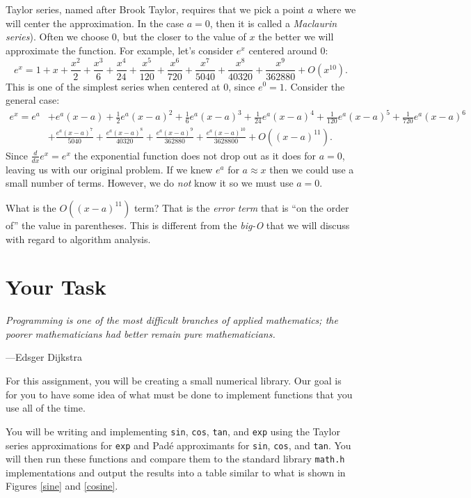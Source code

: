 \documentclass[11pt]{article}
\begin{document}
Taylor series, named after Brook Taylor, requires that we pick a point $a$ where we will center the approximation. In the case $a =0$, then it is called a \emph{Maclaurin series}).  Often we
choose $0$, but the closer to the value of $x$ the better we will
approximate the function. For example, let's consider $e^x$ centered
around $0$:
$$
e^x = 1  +x+\frac{x^2}{2}+\frac{x^3}{6}+\frac{x^4}{24}+\frac{x^5}{120}+\frac{x^6}{720}+\frac{x^7}
   {5040}+\frac{x^8}{40320}+\frac{x^9}{362880}+O\left(x^{10}\right
   ) .
$$
This is one of the simplest series when centered at $0$, since $e^0 = 1$.
Consider the general case:
\begin{align*}
e^x=e^a &+e^a (x-a)+\frac{1}{2} e^a (x-a)^2+\frac{1}{6} e^a (x-a)^3+\frac{1}{24} e^a
   (x-a)^4+\frac{1}{120} e^a (x-a)^5+\frac{1}{720} e^a (x-a)^6 \\
& +\frac{e^a
   (x-a)^7}{5040}+\frac{e^a (x-a)^8}{40320}+\frac{e^a (x-a)^9}{362880}+\frac{e^a
   (x-a)^{10}}{3628800}+O\left((x-a)^{11}\right) .
\end{align*}
Since $\frac{d}{dx}e^x=e^x$ the exponential function does not drop
out as it does for $a=0$, leaving us with our original problem. If we
knew $e^a$ for $a \approx x$ then we could use a small number of
terms. However, we do \emph{not} know it so we must use $a=0$.

What is the $O\left((x-a)^{11}\right)$ term? That is the \emph{error term}
that is ``on the order of'' the value in parentheses. This is different from
the \emph{big-O} that we will discuss with regard to  algorithm analysis.


\section{Your Task}
\epigraph{\emph{Programming is one of the most difficult branches of applied
mathematics; the poorer mathematicians had better remain pure
mathematicians.}}{---Edsger Dijkstra}

\noindent For this assignment, you will be creating a small numerical library. Our goal is for you
to have some idea of what must be done to implement functions that
you use all of the time.

You will be writing and implementing \texttt{sin},
\texttt{cos}, \texttt{tan}, and \texttt{exp} using the Taylor series approximations for
\texttt{exp} and Pad\'e approximants for \texttt{sin}, \texttt{cos}, and
\texttt{tan}. You will then run these functions and compare them to the standard
library \texttt{math.h} implementations and output the results into a table similar to what is shown in
Figures \ref{sine} and \ref{cosine}.
\end{document}
